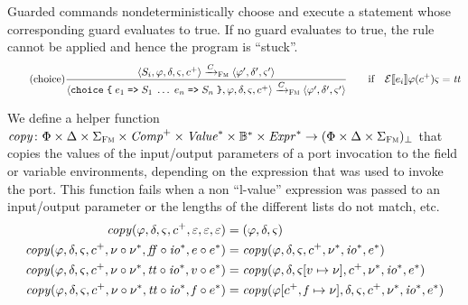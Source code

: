 \documentclass[a4paper,10pt,english]{article}
\begin{document}
Guarded commands nondeterministically choose and execute a statement whose corresponding guard evaluates to true. If no guard
evaluates to true, the rule cannot be applied and hence the program is ``stuck''.
\begin{equation*}
	\tag{choice}
	\dfrac
	{
		\langle S_i, \varphi, \delta, \varsigma, c^+ \rangle
			\xrightarrow{C}_\textsc{Fm}
		\langle \varphi', \delta', \varsigma' \rangle
	}
	{
		\langle \texttt{choice} \; \texttt{\{} \; e_1 \; \texttt{=>} \; S_1 \; \ldots \; e_n \; \texttt{=>} \; S_n \; \texttt{\}}, \varphi,
		\delta, \varsigma,
		c^+ \rangle
			\xrightarrow{C}_\textsc{Fm}
		\langle \varphi', \delta', \varsigma' \rangle
	}
	\qquad \text{if} \quad \mathcal{E} \llbracket e_i \rrbracket \varphi(c^+) \varsigma = \mathit{tt}
\end{equation*}

We define a helper function $\mathit{copy} \colon \Phi \times \Delta \times \Sigma_\textsc{Fm} \times 
\mathit{Comp}^+ \times \mathit{Value}^* \times \mathbb{B}^* \times \mathit{Expr}^* \rightarrow (\Phi \times
\Delta \times \Sigma_\textsc{Fm})_\bot$ that copies the values of the input/output parameters of a port invocation to the field or variable environments, depending on the expression that was used to
invoke the port. This function fails when a non ``l-value'' expression was passed to an
input/output parameter or the lengths of the different lists do not match, etc.
\begin{align*}
	\mathit{copy}(\varphi, \delta, \varsigma, c^+, \varepsilon, \varepsilon, \varepsilon) &= (\varphi, \delta,
	\varsigma)
	\\
	\mathit{copy}(\varphi, \delta, \varsigma, c^+, \nu \circ \nu^*, \mathit{ff} \circ
	\mathit{io}^*, e \circ e^*) &= \mathit{copy}(\varphi, \delta, \varsigma, c^+,
	\nu^*, \mathit{io}^*, e^*)
	\\
	\mathit{copy}(\varphi, \delta, \varsigma, c^+, \nu \circ \nu^*, \mathit{tt} \circ
	\mathit{io}^*, v \circ e^*) &= \mathit{copy}(\varphi, \delta, \varsigma[v \mapsto \nu],
	c^+, \nu^*, \mathit{io}^*, e^*)
	\\
	\mathit{copy}(\varphi, \delta, \varsigma, c^+, \nu \circ \nu^*, \mathit{tt} \circ
	\mathit{io}^*, \mathit{f} \circ e^*) &= \mathit{copy}(\varphi[c^+, \mathit{f} \mapsto \nu],
	\delta, \varsigma, c^+, \nu^*, \mathit{io}^*, e^*)
\end{align*}
\end{document}
